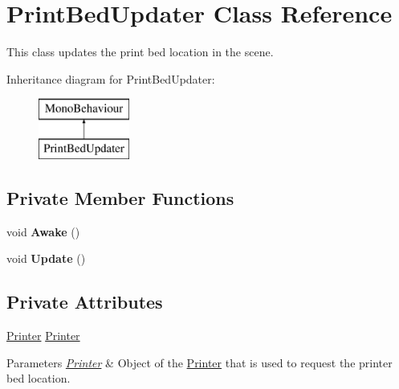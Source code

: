 \hypertarget{class_print_bed_updater}{}\section{Print\+Bed\+Updater Class Reference}
\label{class_print_bed_updater}


This class updates the print bed location in the scene.  


Inheritance diagram for Print\+Bed\+Updater\+:\begin{figure}[H]
\begin{center}
\leavevmode
\includegraphics[height=2.000000cm]{class_print_bed_updater}
\end{center}
\end{figure}
\subsection*{Private Member Functions}
\begin{DoxyCompactItemize}
\item 
\mbox{\label{class_print_bed_updater_a84c4921ef2706e2a253f8308c5f743e0}} 
void {\bfseries Awake} ()
\item 
\mbox{\label{class_print_bed_updater_a9da635b8b219ecf5ce47dcb6a6febd40}} 
void {\bfseries Update} ()
\end{DoxyCompactItemize}
\subsection*{Private Attributes}
\begin{DoxyCompactItemize}
\item 
\mbox{\label{class_print_bed_updater_a4a3f66dcbabccd470441a02ea463fe52}} 
\hyperlink{class_printer}{Printer} \hyperlink{class_print_bed_updater_a4a3f66dcbabccd470441a02ea463fe52}{Printer}
\begin{DoxyCompactList}\small\item\em 
\begin{DoxyParams}{Parameters}
{\em \hyperlink{class_printer}{Printer}} & Object of the \hyperlink{class_printer}{Printer} that is used to request the printer bed location.\\
\hline
\end{DoxyParams}
\end{DoxyCompactList}\end{DoxyCompactItemize}


